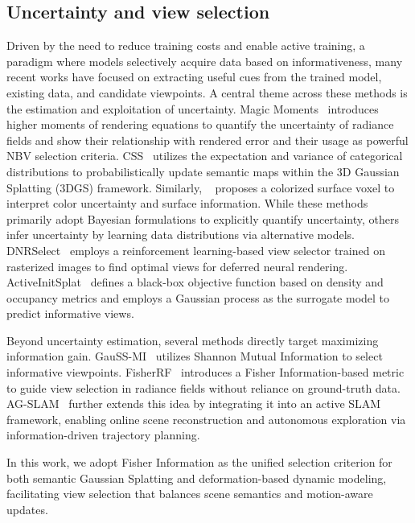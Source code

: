 \subsection{Uncertainty and view selection}
Driven by the need to reduce training costs and enable active training, a paradigm where models selectively acquire data based on informativeness, many recent works have focused on extracting useful cues from the trained model, existing data, and candidate viewpoints. A central theme across these methods is the estimation and exploitation of uncertainty. Magic Moments~\cite{MagicMoments} introduces higher moments of rendering equations to quantify the uncertainty of radiance fields and show their relationship with rendered error and their usage as powerful NBV selection criteria. CSS~\cite{CSS} utilizes the expectation and variance of categorical distributions to probabilistically update semantic maps within the 3D Gaussian Splatting (3DGS) framework. Similarly, ~\cite{activeneural} proposes a colorized surface voxel to interpret color uncertainty and surface information. 
While these methods primarily adopt Bayesian formulations to explicitly quantify uncertainty, others infer uncertainty by learning data distributions via alternative models. DNRSelect~\cite{dnrselect} employs a reinforcement learning-based view selector trained on rasterized images to find optimal views for deferred neural rendering. ActiveInitSplat~\cite{activeinitsplat} defines a black-box objective function based on density and occupancy metrics and employs a Gaussian process as the surrogate model to predict informative views.   

Beyond uncertainty estimation, several methods directly target maximizing information gain. GauSS-MI~\cite{gaussmi} utilizes Shannon Mutual Information to select informative viewpoints. FisherRF~\cite{fisherrf} introduces a Fisher Information-based metric to guide view selection in radiance fields without reliance on ground-truth data. AG-SLAM~\cite{agslam} further extends this idea by integrating it into an active SLAM framework, enabling online scene reconstruction and autonomous exploration via information-driven trajectory planning.

In this work, we adopt Fisher Information as the unified selection criterion for both semantic Gaussian Splatting and deformation-based dynamic modeling, facilitating view selection that balances scene semantics and motion-aware updates.





